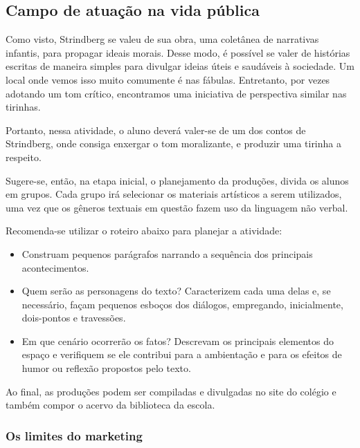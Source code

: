\documentclass[12pt]{extarticle}
\begin{document}
\subsection{Campo de atuação na vida pública}

Como visto, Strindberg se valeu de sua obra, uma coletânea de
narrativas infantis, para propagar ideais morais. Desse modo, é
possível se valer de histórias escritas de maneira simples para
divulgar ideias úteis e saudáveis à sociedade. Um local onde vemos
isso muito comumente é nas fábulas. Entretanto, por vezes adotando um
tom crítico, encontramos uma iniciativa de perspectiva similar nas
tirinhas.


Portanto, nessa atividade, o aluno deverá valer-se de um dos contos de
Strindberg, onde consiga enxergar o tom moralizante, e produzir uma
tirinha a respeito.

Sugere-se, então, na etapa inicial, o planejamento da produções, divida
os alunos em grupos. Cada grupo irá selecionar os materiais artísticos a
serem utilizados, uma vez que os gêneros textuais em questão fazem uso
da linguagem não verbal.

Recomenda-se utilizar o roteiro abaixo para planejar a atividade:

\begin{itemize}
\item
Construam pequenos parágrafos narrando a sequência dos principais
acontecimentos.
\item
Quem serão as personagens do texto? Caracterizem cada uma delas e, se
necessário, façam pequenos esboços dos diálogos, empregando,
inicialmente, dois-pontos e travessões.
\item
Em que cenário ocorrerão os fatos? Descrevam os principais elementos
do espaço e verifiquem se ele contribui para a ambientação e para os
efeitos de humor ou reflexão propostos pelo texto.
\end{itemize}

Ao final, as produções podem ser compiladas e divulgadas no site do
colégio e também compor o acervo da biblioteca da escola.

\subsubsection{Os limites do marketing}
\end{document}
